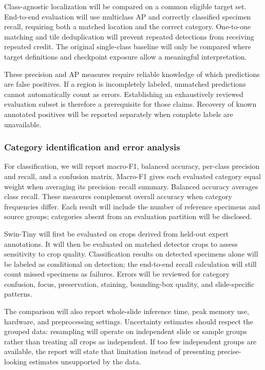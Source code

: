 \documentclass[conference,letterpaper]{IEEEtran}
\begin{document}
Class-agnostic localization will be compared on a common eligible target set. End-to-end evaluation will use multiclass AP and correctly classified specimen recall, requiring both a matched location and the correct category. One-to-one matching and tile deduplication will prevent repeated detections from receiving repeated credit. The original single-class baseline will only be compared where target definitions and checkpoint exposure allow a meaningful interpretation.

These precision and AP measures require reliable knowledge of which predictions are false positives. If a region is incompletely labeled, unmatched predictions cannot automatically count as errors. Establishing an exhaustively reviewed evaluation subset is therefore a prerequisite for those claims. Recovery of known annotated positives will be reported separately when complete labels are unavailable.

\subsubsection{Category identification and error analysis}
For classification, we will report macro-F1, balanced accuracy, per-class precision and recall, and a confusion matrix. Macro-F1 gives each evaluated category equal weight when averaging its precision--recall summary. Balanced accuracy averages class recall. These measures complement overall accuracy when category frequencies differ. Each result will include the number of reference specimens and source groups; categories absent from an evaluation partition will be disclosed.

Swin-Tiny will first be evaluated on crops derived from held-out expert annotations. It will then be evaluated on matched detector crops to assess sensitivity to crop quality. Classification results on detected specimens alone will be labeled as conditional on detection; the end-to-end recall calculation will still count missed specimens as failures. Errors will be reviewed for category confusion, focus, preservation, staining, bounding-box quality, and slide-specific patterns.

The comparison will also report whole-slide inference time, peak memory use, hardware, and preprocessing settings. Uncertainty estimates should respect the grouped data: resampling will operate on independent slide or sample groups rather than treating all crops as independent. If too few independent groups are available, the report will state that limitation instead of presenting precise-looking estimates unsupported by the data.
\end{document}
